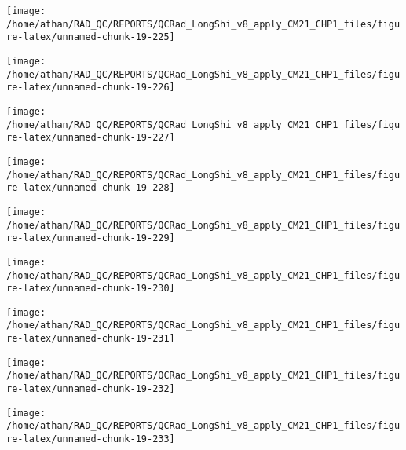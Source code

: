 \documentclass[
  10pt,
  a4paper,oneside]{article}
\begin{document}
\begin{center}\texttt{[image: /home/athan/RAD\_QC/REPORTS/QCRad\_LongShi\_v8\_apply\_CM21\_CHP1\_files/figure-latex/unnamed-chunk-19-225]} \end{center}

\begin{center}\texttt{[image: /home/athan/RAD\_QC/REPORTS/QCRad\_LongShi\_v8\_apply\_CM21\_CHP1\_files/figure-latex/unnamed-chunk-19-226]} \end{center}

\begin{center}\texttt{[image: /home/athan/RAD\_QC/REPORTS/QCRad\_LongShi\_v8\_apply\_CM21\_CHP1\_files/figure-latex/unnamed-chunk-19-227]} \end{center}

\begin{center}\texttt{[image: /home/athan/RAD\_QC/REPORTS/QCRad\_LongShi\_v8\_apply\_CM21\_CHP1\_files/figure-latex/unnamed-chunk-19-228]} \end{center}

\begin{center}\texttt{[image: /home/athan/RAD\_QC/REPORTS/QCRad\_LongShi\_v8\_apply\_CM21\_CHP1\_files/figure-latex/unnamed-chunk-19-229]} \end{center}

\begin{center}\texttt{[image: /home/athan/RAD\_QC/REPORTS/QCRad\_LongShi\_v8\_apply\_CM21\_CHP1\_files/figure-latex/unnamed-chunk-19-230]} \end{center}

\begin{center}\texttt{[image: /home/athan/RAD\_QC/REPORTS/QCRad\_LongShi\_v8\_apply\_CM21\_CHP1\_files/figure-latex/unnamed-chunk-19-231]} \end{center}

\begin{center}\texttt{[image: /home/athan/RAD\_QC/REPORTS/QCRad\_LongShi\_v8\_apply\_CM21\_CHP1\_files/figure-latex/unnamed-chunk-19-232]} \end{center}

\begin{center}\texttt{[image: /home/athan/RAD\_QC/REPORTS/QCRad\_LongShi\_v8\_apply\_CM21\_CHP1\_files/figure-latex/unnamed-chunk-19-233]} \end{center}
\end{document}
